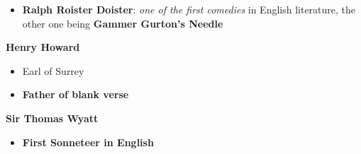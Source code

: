 \documentclass[
  12pt,
    progressbar=frametitle]{beamer}
\providecommand{\tightlist}{%
  \setlength{\itemsep}{0pt}\setlength{\parskip}{0pt}}
\begin{document}
\begin{frame}[allowframebreaks]
\begin{itemize}
  \begin{itemize}
  \tightlist
  \item
    \textbf{Ralph Roister Doister}: \emph{one of the first comedies} in
    English literature, the other one being \textbf{Gammer Gurton's
    Needle}
  \end{itemize}
\end{itemize}

\large\textbf{Henry Howard}\normalsize\vspace{-3mm}

\begin{itemize}
\tightlist
\item
  Earl of Surrey
\item
  \textbf{Father of blank verse}
\end{itemize}

\large\textbf{Sir Thomas Wyatt}\normalsize\vspace{-3mm}

\begin{itemize}
\tightlist
\item
  \textbf{First Sonneteer in English}
\end{itemize}
\end{frame}
\end{document}
